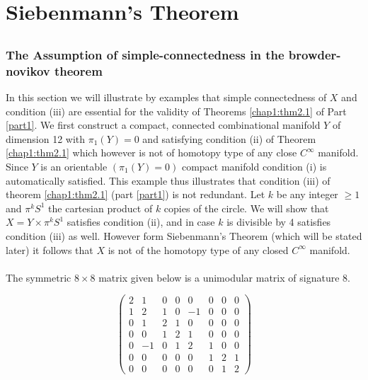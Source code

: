 

\part{Siebenmann's Theorem}\label{part2}

\chapter{}


\thispagestyle{plain}

\setcounter{section}{0}
\section[The Assumption of simple-connectedness...]{The Assumption of simple-connectedness in the browder-novikov
  theorem}\label{chap2:sec1}\pageoriginale %


In this  section we will illustrate by examples that simple
connectedness of $X$ and condition (iii) are essential for the
validity of Theorems \ref{chap1:thm2.1} of Part \ref{part1}. We first
construct a compact, 
connected combinational manifold $Y$ of dimension 12 with $\pi_1 (Y) =
0$ and satisfying condition (ii) of Theorem \ref{chap1:thm2.1} which however is not
of homotopy type of any close $C^\infty$ manifold. Since $Y$ is an
orientable $(\pi_1 (Y) = 0)$ compact manifold condition (i) is
automatically satisfied. This example thus illustrates that condition
(iii) of theorem \ref{chap1:thm2.1} (part \ref{part1}) is not
redundant. Let $k$ be any integer 
$\geq 1$ and $\pi^k S^1$ the cartesian product of $k$ copies
of the circle. We will show that $X = Y \times \pi^k  S^1$
satisfies condition (ii), and in case $k$ is divisible by 4 satisfies
condition (iii) as well. However form Siebenmann's Theorem (which will
be stated later) it follows that $X$ is not of the homotopy type of
any closed $C^\infty$ manifold.  

\subsection{}%
The symmetric $8 \times 8$ matrix given below is a unimodular matrix
of signature 8.  

\begin{equation*}
\begin{pmatrix}
2 & 1 & 0 &  0 &  0 & 0 & 0 & 0 \\
1 & 2 & 1 &  0 & -1 & 0 & 0 & 0 \\
0 & 1 & 2 &  1 &  0 & 0 & 0 & 0 \\
0 & 0 & 1 &  2 &  1 & 0 & 0 & 0 \\
0 & -1 & 0 &  1 &  2 & 1 & 0 & 0 \\
0 & 0 & 0 &  0 &  0 & 1 & 2 & 1 \\
0 & 0 & 0 &  0 &  0 & 0 & 1 & 2
\end{pmatrix}
\end{equation*}

